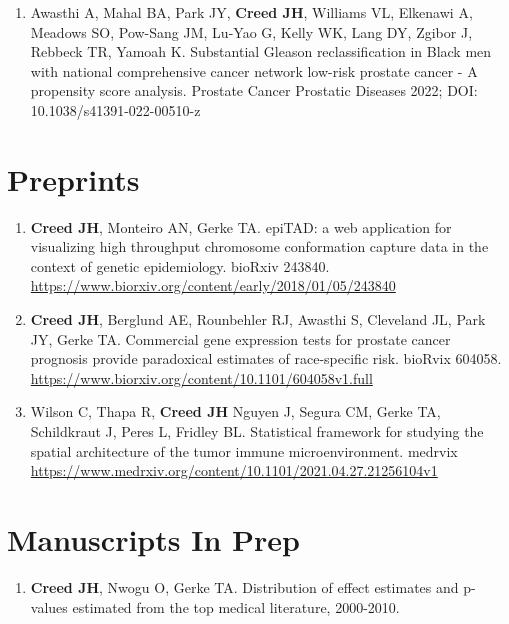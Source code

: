 \documentclass[11pt, a4paper]{article} %
\begin{document}
\begin{enumerate}[leftmargin=*]
\item{} Awasthi A, Mahal BA, Park JY, {\bf Creed JH}, Williams VL, Elkenawi A, Meadows SO, Pow-Sang JM, Lu-Yao G, Kelly WK, Lang DY, Zgibor J, Rebbeck TR, Yamoah K.  Substantial Gleason reclassification in Black men with national comprehensive cancer network low-risk prostate cancer - A propensity score analysis. Prostate Cancer Prostatic Diseases 2022; DOI: 10.1038/s41391-022-00510-z

\end{enumerate}

\section*{Preprints}
\begin{enumerate}[leftmargin=*]

\item{} {\bf Creed JH}, Monteiro AN, Gerke TA. epiTAD: a web application for visualizing high throughput chromosome conformation capture data in the context of genetic epidemiology. bioRxiv 243840. \href{https://www.biorxiv.org/content/early/2018/01/05/243840}{https://www.biorxiv.org/content/early/2018/01/05/243840}

\item{} {\bf Creed JH}, Berglund AE, Rounbehler RJ, Awasthi S, Cleveland JL, Park JY, Gerke TA. Commercial gene expression tests for prostate cancer prognosis provide  paradoxical estimates of race-specific risk. bioRvix 604058. \\\href{https://www.biorxiv.org/content/10.1101/604058v1.full}{https://www.biorxiv.org/content/10.1101/604058v1.full}

\item{} Wilson C, Thapa R, {\bf Creed JH} Nguyen J, Segura CM, Gerke TA, Schildkraut J, Peres L, Fridley BL. Statistical framework for studying the spatial architecture of the tumor immune microenvironment. medrvix \\\href{https://www.medrxiv.org/content/10.1101/2021.04.27.21256104v1}{https://www.medrxiv.org/content/10.1101/2021.04.27.21256104v1}
\end{enumerate}

\section*{Manuscripts In Prep}
\begin{enumerate}[leftmargin=*]

\item{} {\bf Creed JH}, Nwogu O, Gerke TA. Distribution of effect estimates and p-values estimated from the top medical literature, 2000-2010. 

\end{enumerate}
\end{document}
